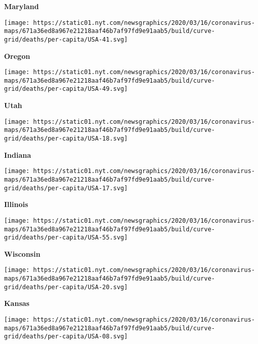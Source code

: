 \textbf{Maryland}

\href{https://www.nytimes.com/interactive/2020/us/oregon-coronavirus-cases.html}{}

\texttt{[image: https://static01.nyt.com/newsgraphics/2020/03/16/coronavirus-maps/671a36ed8a967e21218aaf46b7af97fd9e91aab5/build/curve-grid/deaths/per-capita/USA-41.svg]}

\textbf{Oregon}

\href{https://www.nytimes.com/interactive/2020/us/utah-coronavirus-cases.html}{}

\texttt{[image: https://static01.nyt.com/newsgraphics/2020/03/16/coronavirus-maps/671a36ed8a967e21218aaf46b7af97fd9e91aab5/build/curve-grid/deaths/per-capita/USA-49.svg]}

\textbf{Utah}

\href{https://www.nytimes.com/interactive/2020/us/indiana-coronavirus-cases.html}{}

\texttt{[image: https://static01.nyt.com/newsgraphics/2020/03/16/coronavirus-maps/671a36ed8a967e21218aaf46b7af97fd9e91aab5/build/curve-grid/deaths/per-capita/USA-18.svg]}

\textbf{Indiana}

\href{https://www.nytimes.com/interactive/2020/us/illinois-coronavirus-cases.html}{}

\texttt{[image: https://static01.nyt.com/newsgraphics/2020/03/16/coronavirus-maps/671a36ed8a967e21218aaf46b7af97fd9e91aab5/build/curve-grid/deaths/per-capita/USA-17.svg]}

\textbf{Illinois}

\href{https://www.nytimes.com/interactive/2020/us/wisconsin-coronavirus-cases.html}{}

\texttt{[image: https://static01.nyt.com/newsgraphics/2020/03/16/coronavirus-maps/671a36ed8a967e21218aaf46b7af97fd9e91aab5/build/curve-grid/deaths/per-capita/USA-55.svg]}

\textbf{Wisconsin}

\href{https://www.nytimes.com/interactive/2020/us/kansas-coronavirus-cases.html}{}

\texttt{[image: https://static01.nyt.com/newsgraphics/2020/03/16/coronavirus-maps/671a36ed8a967e21218aaf46b7af97fd9e91aab5/build/curve-grid/deaths/per-capita/USA-20.svg]}

\textbf{Kansas}

\href{https://www.nytimes.com/interactive/2020/us/colorado-coronavirus-cases.html}{}

\texttt{[image: https://static01.nyt.com/newsgraphics/2020/03/16/coronavirus-maps/671a36ed8a967e21218aaf46b7af97fd9e91aab5/build/curve-grid/deaths/per-capita/USA-08.svg]}

